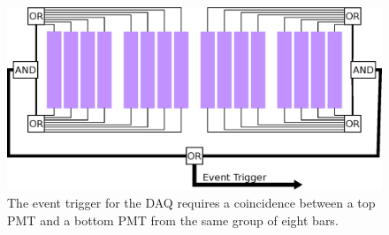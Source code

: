 \begin{figure}[htp]
\centering
\includegraphics[width=1.0\textwidth]{figures/event_trigger.eps}
\caption[DAQ event trigger.]{The event trigger for the DAQ requires a coincidence between a top PMT and a bottom PMT from the same group of eight bars.}
\label{fig:eventTrig}
\end{figure}

